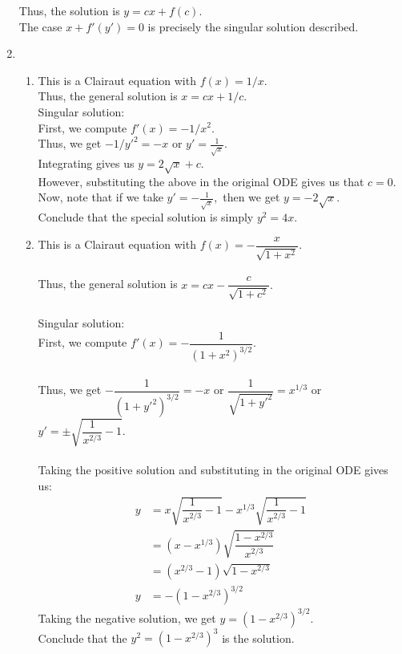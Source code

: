 \documentclass[12pt]{article}
\begin{document}
\begin{enumerate}[label = Q.\arabic*.]
	Thus, the solution is $y = cx + f(c).$\\
	The case $x + f'(y') = 0$ is precisely the singular solution described.
	\item 
	\begin{enumerate}[label = (\roman*)] 
		\item This is a Clairaut equation with $f(x) = 1/x.$\\
		Thus, the general solution is $x = cx + 1/c.$\\
		Singular solution:\\
		First, we compute $f'(x) = -1/x^2.$\\
		Thus, we get $-1/y'^2 = -x$ or $y' = \frac{1}{\sqrt{x}}.$\\
		Integrating gives us $y = 2\sqrt{x} + c.$\\
		However, substituting the above in the original ODE gives us that $c = 0.$ \\
		Now, note that if we take $y' = -\frac{1}{\sqrt{x}},$ then we get $y = -2\sqrt{x}.$\\
		Conclude that the special solution is simply $y^2 = 4x.$
		\item This is a Clairaut equation with $f(x) = -\dfrac{x}{\sqrt{1 + x^2}}.$\\~\\
		Thus, the general solution is $x = cx -\dfrac{c}{\sqrt{1 + c^2}}.$\\~\\
		Singular solution:\\
		First, we compute $f'(x) = -\dfrac{1}{(1 + x^2)^{3/2}}.$\\~\\
		Thus, we get $-\dfrac{1}{(1 + y'^2)^{3/2}} = -x$ or $\dfrac{1}{\sqrt{1 + y'^2}} = x^{1/3}$ or $y' = \pm\sqrt{\dfrac{1}{x^{2/3}} - 1}.$\\~\\
		Taking the positive solution and substituting in the original ODE gives us:
		\begin{align*} 
			y &= x\sqrt{\dfrac{1}{x^{2/3}} - 1} - x^{1/3}\sqrt{\dfrac{1}{x^{2/3}} - 1}\\
			& = (x - x^{1/3})\sqrt{\dfrac{1 - x^{2/3}}{x^{2/3}}}\\
			&= (x^{2/3} - 1)\sqrt{1 - x^{2/3}}\\
			y &= -(1 - x^{2/3})^{3/2}
		\end{align*}
		Taking the negative solution, we get $y = (1 - x^{2/3})^{3/2}.$\\
		Conclude that the $y^2 = (1 - x^{2/3})^3$ is the solution.\\

\end{enumerate}
\end{enumerate}
\end{document}
